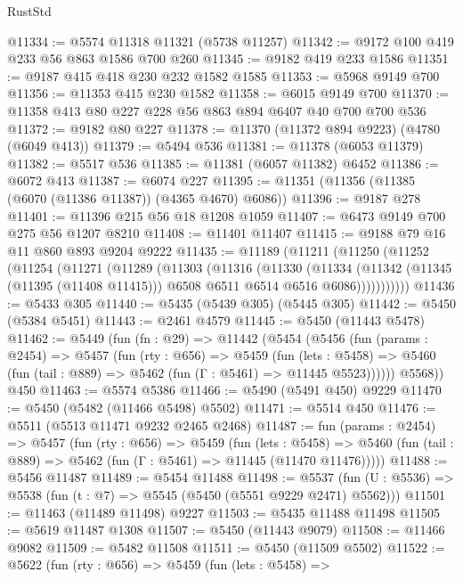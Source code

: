 \begin{lexlean}{RustStd}
\begin{coremodule}
@11334 := @5574 @11318 @11321 (@5738 @11257)
@11342 := @9172 @100 @419 @233 @56 @863 @1586 @700 @260
@11345 := @9182 @419 @233 @1586
@11351 := @9187 @415 @418 @230 @232 @1582 @1585
@11353 := @5968 @9149 @700
@11356 := @11353 @415 @230 @1582
@11358 := @6015 @9149 @700
@11370 := @11358 @413 @80 @227 @228 @56 @863 @894 @6407 @40 @700 @700 @536
@11372 := @9182 @80 @227
@11378 := @11370 (@11372 @894 @9223) (@4780 (@6049 @413))
@11379 := @5494 @536
@11381 := @11378 (@6053 @11379)
@11382 := @5517 @536
@11385 := @11381 (@6057 @11382) @6452
@11386 := @6072 @413
@11387 := @6074 @227
@11395 := @11351 (@11356 (@11385 (@6070 (@11386 @11387)) (@4365 @4670) @6086))
@11396 := @9187 @278
@11401 := @11396 @215 @56 @18 @1208 @1059
@11407 := @6473 @9149 @700 @275 @56 @1207 @8210
@11408 := @11401 @11407
@11415 := @9188 @79 @16 @11 @860 @893 @9204 @9222
@11435 := @11189
    (@11211
      (@11250
        (@11252
          (@11254
            (@11271
              (@11289
                (@11303
                  (@11316
                    (@11330
                      (@11334
                        (@11342
                          (@11345 (@11395 (@11408 @11415)))
                          @6508
                          @6511
                          @6514
                          @6516
                          @6086)))))))))))
@11436 := @5433 @305
@11440 := @5435 (@5439 @305) (@5445 @305)
@11442 := @5450 (@5384 @5451)
@11443 := @2461 @4579
@11445 := @5450 (@11443 @5478)
@11462 := @5449
    (fun (fn : @29) =>
    @11442
      (@5454
        (@5456
          (fun (params : @2454) =>
          @5457
            (fun (rty : @656) =>
            @5459
              (fun (lets : @5458) =>
              @5460 (fun (tail : @889) => @5462 (fun (Γ : @5461) => @11445 @5523))))))
        @5568))
    @450
@11463 := @5574 @5386
@11466 := @5490 (@5491 @450) @9229
@11470 := @5450 (@5482 (@11466 @5498) @5502)
@11471 := @5514 @450
@11476 := @5511 (@5513 @11471 @9232 @2465 @2468)
@11487 := fun (params : @2454) =>
  @5457
    (fun (rty : @656) =>
    @5459
      (fun (lets : @5458) =>
      @5460 (fun (tail : @889) => @5462 (fun (Γ : @5461) => @11445 (@11470 @11476)))))
@11488 := @5456 @11487
@11489 := @5454 @11488
@11498 := @5537 (fun (U : @5536) => @5538 (fun (t : @7) => @5545 (@5450 (@5551 @9229 @2471) @5562)))
@11501 := @11463 (@11489 @11498) @9227
@11503 := @5435 @11488 @11498
@11505 := @5619 @11487 @1308
@11507 := @5450 (@11443 @9079)
@11508 := @11466 @9082
@11509 := @5482 @11508
@11511 := @5450 (@11509 @5502)
@11522 := @5622
    (fun (rty : @656) =>
    @5459
      (fun (lets : @5458) =>

\end{coremodule}
\end{lexlean}
